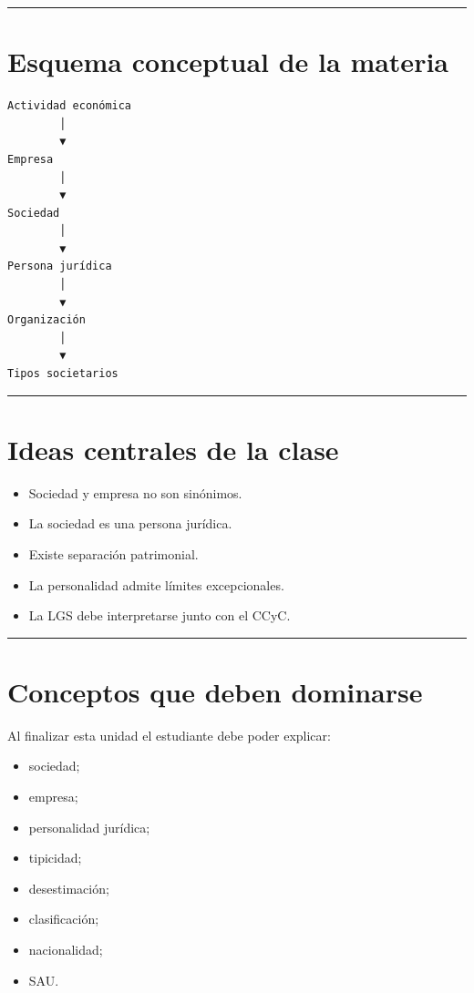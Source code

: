 \documentclass[
  spanish,
  letterpaper,
  DIV=11,
  numbers=noendperiod]{scrartcl}
\providecommand{\tightlist}{%
  \setlength{\itemsep}{0pt}\setlength{\parskip}{0pt}}
\begin{document}
\begin{center}\rule{0.5\linewidth}{0.5pt}\end{center}

\section{Esquema conceptual de la
materia}\label{esquema-conceptual-de-la-materia}

\begin{verbatim}
Actividad económica
        │
        ▼
Empresa
        │
        ▼
Sociedad
        │
        ▼
Persona jurídica
        │
        ▼
Organización
        │
        ▼
Tipos societarios
\end{verbatim}

\begin{center}\rule{0.5\linewidth}{0.5pt}\end{center}

\section{Ideas centrales de la clase}\label{ideas-centrales-de-la-clase}

\begin{itemize}
\tightlist
\item
  Sociedad y empresa no son sinónimos.
\item
  La sociedad es una persona jurídica.
\item
  Existe separación patrimonial.
\item
  La personalidad admite límites excepcionales.
\item
  La LGS debe interpretarse junto con el CCyC.
\end{itemize}

\begin{center}\rule{0.5\linewidth}{0.5pt}\end{center}

\section{Conceptos que deben
dominarse}\label{conceptos-que-deben-dominarse}

Al finalizar esta unidad el estudiante debe poder explicar:

\begin{itemize}
\tightlist
\item
  sociedad;
\item
  empresa;
\item
  personalidad jurídica;
\item
  tipicidad;
\item
  desestimación;
\item
  clasificación;
\item
  nacionalidad;
\item
  SAU.
\end{itemize}
\end{document}
